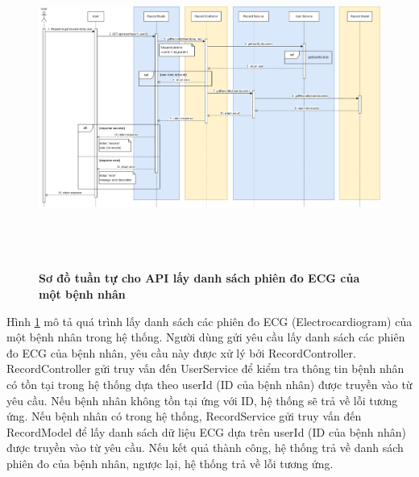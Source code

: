 \begin{figure}[H]
  \centering
  \includegraphics[width=16cm,height=10.5cm]{Images/sequence_api/getRecordsByUser.png}
  \caption[Sơ đồ tuần tự cho API lấy danh sách phiên đo ECG của một bệnh nhân ]{\bfseries \fontsize{12pt}{0pt}
  \selectfont Sơ đồ tuần tự cho API lấy danh sách phiên đo ECG của một bệnh nhân }
  \label{api_getRecordsByUser} %
\end{figure}
Hình \ref{api_getRecordsByUser} mô tả quá trình lấy danh sách các phiên đo ECG (Electrocardiogram) của một bệnh nhân trong hệ thống. Người dùng gửi yêu cầu lấy danh sách các phiên đo ECG của bệnh nhân, 
yêu cầu này được xử lý bởi RecordController. RecordController gửi truy vấn đến UserService để kiểm tra thông tin bệnh nhân có tồn tại trong hệ thống dựa theo userId (ID của bệnh nhân) được truyền vào từ yêu cầu. Nếu bệnh nhân không tồn tại ứng với ID, hệ thống sẽ
trả về   lỗi tương ứng. Nếu bệnh nhân có trong hệ thống, RecordService gửi truy vấn đến RecordModel để lấy danh sách dữ liệu ECG dựa trên userId (ID của bệnh nhân) được truyền vào từ yêu cầu. 
Nếu kết quả thành công, hệ thống trả về danh sách phiên đo của bệnh nhân, ngược lại, hệ thống trả về lỗi tương ứng.

